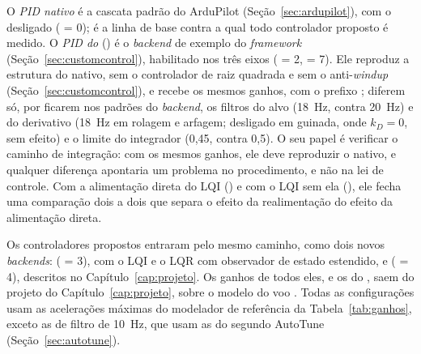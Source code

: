 \begin{table}[htbp]
\end{table}

O \emph{PID nativo} é a cascata padrão do ArduPilot
(Seção~\ref{sec:ardupilot}), com o  desligado
( = 0); é a linha de base contra a qual todo controlador
proposto é medido. O \emph{PID do} 
() é o \textit{backend} de exemplo do \textit{framework}
(Seção~\ref{sec:customcontrol}), habilitado nos três eixos
( = 2,  = 7). Ele reproduz a
estrutura do nativo, sem o controlador de raiz quadrada e sem o
anti-\textit{windup} (Seção~\ref{sec:customcontrol}), e recebe os mesmos
ganhos, com o prefixo ; diferem só, por ficarem nos padrões do
\textit{backend}, os filtros do alvo (\SI{18}{\hertz}, contra
\SI{20}{\hertz}) e do derivativo (\SI{18}{\hertz} em rolagem e arfagem;
desligado em guinada, onde $k_D = 0$, sem efeito) e o limite do integrador
(0,45, contra 0,5). O seu papel é verificar o caminho de integração: com os
mesmos ganhos, ele deve reproduzir o nativo, e qualquer diferença apontaria um
problema no procedimento, e não na lei de controle. Com a alimentação direta
do LQI () e com o LQI sem ela
(), ele fecha uma comparação dois a dois que separa
o efeito da realimentação do efeito da alimentação direta.

Os controladores propostos entraram pelo mesmo caminho, como dois novos
\textit{backends}:  ( = 3),
com o LQI e o LQR com observador de estado estendido, e
 ( = 4), descritos no
Capítulo~\ref{cap:projeto}. Os ganhos de todos eles, e os do
, saem do projeto do Capítulo~\ref{cap:projeto}, sobre o
modelo do voo . Todas as
configurações usam as acelerações máximas do modelador de referência da
Tabela~\ref{tab:ganhos}, exceto as de filtro de \SI{10}{\hertz}, que usam as
do segundo AutoTune (Seção~\ref{sec:autotune}).

